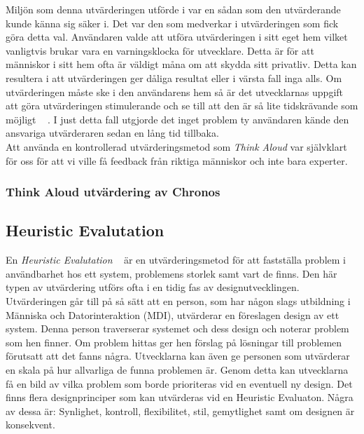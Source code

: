 \documentclass[a4paper, 11pt]{article}
\begin{document}
Miljön som denna utvärderingen utförde i var en sådan som den utvärderande kunde känna sig säker i. Det var den som medverkar i utvärderingen som fick göra detta val. Användaren valde att utföra utvärderingen i sitt eget hem vilket vanligtvis brukar vara en varningsklocka för utvecklare. Detta är för att människor i sitt hem ofta är väldigt måna om att skydda sitt privatliv. Detta kan resultera i att utvärderingen ger dåliga resultat eller i värsta fall inga alls. Om utvärderingen måste ske i den användarens hem så är det utvecklarnas uppgift att göra utvärderingen stimulerande och se till att den är så lite tidskrävande som möjligt ~\cite[sid 245]{benyon2010designing} .
I just detta fall utgjorde det inget problem ty användaren kände den ansvariga utvärderaren sedan en lång tid tillbaka. \\

Att använda en kontrollerad utvärderingsmetod som \textit{Think Aloud} var självklart för oss för att vi ville få feedback från riktiga människor och inte bara experter.

\subsubsection{Think Aloud utvärdering av Chronos}

  

\subsection{Heuristic Evalutation}
En \textit{Heuristic Evalutation} ~\cite[sid 228--229]{benyon2010designing} är en utvärderingsmetod för att fastställa problem i användbarhet hos ett system, problemens storlek samt vart de finns. Den här typen av utvärdering utförs ofta i en tidig fas av designutvecklingen. 
Utvärderingen går till på så sätt att en person, som har någon slags utbildning i Människa och Datorinteraktion (MDI), utvärderar en föreslagen design av ett system. Denna person traverserar systemet och dess design och noterar problem som hen finner. Om problem hittas ger hen förslag på lösningar till problemen förutsatt att det fanns några. Utvecklarna kan även ge personen som utvärderar en skala på hur allvarliga de funna problemen är. Genom detta kan utvecklarna få en bild av vilka problem som borde prioriteras vid en eventuell ny design. Det finns flera designprinciper som kan utvärderas vid en Heuristic Evaluaton. Några av dessa är: Synlighet, kontroll, flexibilitet, stil, gemytlighet samt om designen är konsekvent. \\
\end{document}
